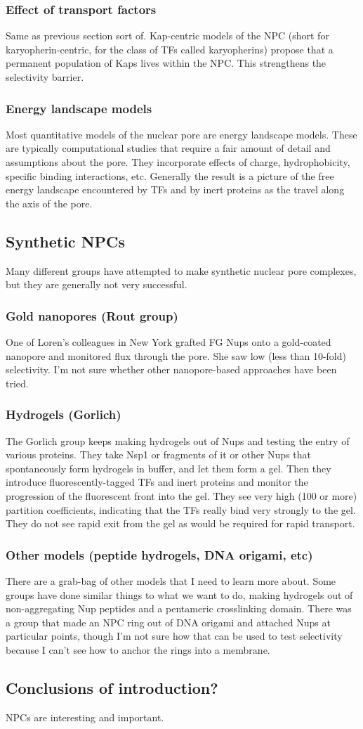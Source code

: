 \subsubsection{Effect of transport factors}
Same as previous section sort of.  Kap-centric models of the NPC (short for karyopherin-centric, for the class of TFs called karyopherins) propose that a permanent population of Kaps lives within the NPC.  This strengthens the selectivity barrier.
\subsubsection{Energy landscape models}
Most quantitative models of the nuclear pore are energy landscape models.  These are typically computational studies that require a fair amount of detail and assumptions about the pore.  They incorporate effects of charge, hydrophobicity, specific binding interactions, etc.  Generally the result is a picture of the free energy landscape encountered by TFs and by inert proteins as the travel along the axis of the pore.
\subsection{Synthetic NPCs}
Many different groups have attempted to make synthetic nuclear pore complexes, but they are generally not very successful.
\subsubsection{Gold nanopores (Rout group)}
One of Loren's colleagues in New York grafted FG Nups onto a gold-coated nanopore and monitored flux through the pore.  She saw low (less than 10-fold) selectivity.  I'm not sure whether other nanopore-based approaches have been tried.
\subsubsection{Hydrogels (Gorlich)}
The Gorlich group keeps making hydrogels out of Nups and testing the entry of various proteins.  They take Nsp1 or fragments of it or other Nups that spontaneously form hydrogels in buffer, and let them form a gel.  Then they introduce fluorescently-tagged TFs and inert proteins and monitor the progression of the fluorescent front into the gel.  They see very high (100 or more) partition coefficients, indicating that the TFs really bind very strongly to the gel.  They do not see rapid exit from the gel as would be required for rapid transport.
\subsubsection{Other models (peptide hydrogels, DNA origami, etc)}
There are a grab-bag of other models that I need to learn more about.  Some groups have done similar things to what we want to do, making hydrogels out of non-aggregating Nup peptides and a pentameric crosslinking domain.  There was a group that made an NPC ring out of DNA origami and attached Nups at particular points, though I'm not sure how that can be used to test selectivity because I can't see how to anchor the rings into a membrane.
\subsection{Conclusions of introduction?}
NPCs are interesting and important.

